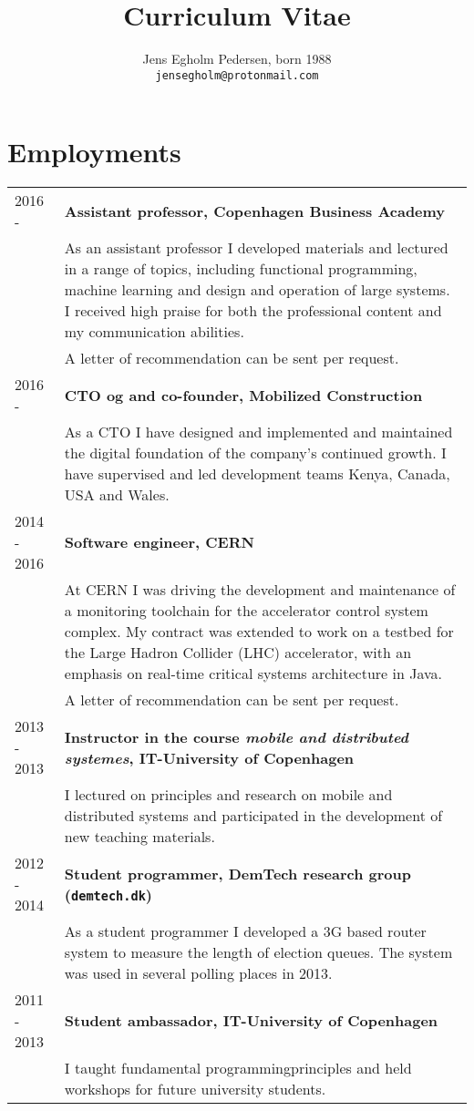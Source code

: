 \documentclass[12pt,a4paper,notitlepage]{article}
\author{Jens Egholm Pedersen, born 1988
\\ \texttt{jensegholm@protonmail.com}
}
\title{Curriculum Vitae}
\begin{document}
\maketitle

\section*{Employments}
\begin{tabularx}{\textwidth}{l X}
2016 -      & \textbf{Assistant professor, Copenhagen Business Academy} \\
            & As an assistant professor I developed materials and lectured in
              a range of topics, including functional programming,
              machine learning and design and operation of large systems.
              I received high praise for both the
              professional content and my communication abilities.\\
            & A letter of recommendation can be sent per request. \\
2016 -      & \textbf{CTO og and co-founder, Mobilized Construction} \\
            & As a CTO I have designed and implemented and maintained the
              digital foundation of the company's continued growth.
              I have supervised and led development teams Kenya, Canada, USA and Wales.\\
2014 - 2016 & \textbf{Software engineer, CERN} \\
            & At CERN I was driving the development and maintenance of
              a monitoring toolchain for the accelerator control system complex.
              My contract was extended to work on a testbed for the Large Hadron
              Collider (LHC) accelerator, with an emphasis on real-time critical
              systems architecture in Java. \\
            & A letter of recommendation can be sent per request. \\
2013 - 2013 & \textbf{Instructor in the course \textit{mobile and distributed systemes}, IT-University of Copenhagen} \\
            & I lectured on principles and research on mobile and distributed
              systems and participated in the development of new teaching
              materials. \\
2012 - 2014 & \textbf{Student programmer, DemTech research group (\texttt{demtech.dk})} \\
            & As a student programmer I developed a 3G based router system to
              measure the length of election queues. The system was used
              in several polling places in 2013.\\
2011 - 2013 & \textbf{Student ambassador, IT-University of Copenhagen} \\
            & I taught fundamental programmingprinciples and held workshops for
              future university students.
\end{tabularx}
\end{document}

